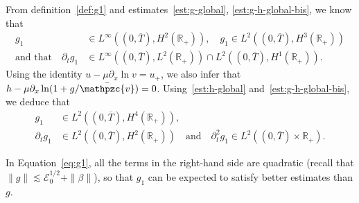 \documentclass[AHL,Unicode,longabstracts,published]{cedram}
\newcommand{\R}{\mathbb{R}}
\newcommand{\p}{\partial}
\newcommand{\bv}{\bar{\mathpzc{v}}}
\newcommand{\cE}{\mathcal E}
\begin{document}
From definition~\eqref{def:g1} and estimates~\eqref{est:g-global}, \eqref{est:g-h-global-bis}, we know that
\begin{equation}\label{reg:g1-1}
\begin{split}
g_1 &\in L^\infty\left((0, \overline{T}), H^2(\R_+)\right), \quad g_1\in L^2\left((0,\overline{T}), H^3(\R_+)\right)\\
\text{and that} \quad \p_t g_1 &\in L^\infty\left((0,\overline{T}), L^2(\R_+)\right)\cap L^2\left((0, \overline{T}), H^1(\R_+)\right).
\end{split}
\end{equation}
Using the identity $u-\mu\p_x \ln v=u_+$, we also infer that $h-\mu\p_x \ln (1+g/\bv)=0$. Using~\eqref{est:h-global} and~\eqref{est:g-h-global-bis}, we deduce that
\begin{equation}\label{reg:g1-3}
\begin{split}
g_1 &\in L^2\left((0, \overline{T}), H^4(\R_+)\right),
\\
\p_t g_1&\in L^2\left((0, \overline{T}), H^2(\R_+)\right) \quad \text{and} \quad \p^2_t g_1\in L^2\left((0, \overline{T}) \times \R_+\right).
\end{split}
\end{equation}



\begin{rema}\label{rmk:g1}
In Equation~\eqref{eq:g1}, all the terms in the right-hand side are quadratic (recall that $\|g\| \lesssim \cE_0^{1/2} + \|\beta\|$), so that $g_1$ can be expected to satisfy better estimates than $g$.
\end{rema}
\end{document}
